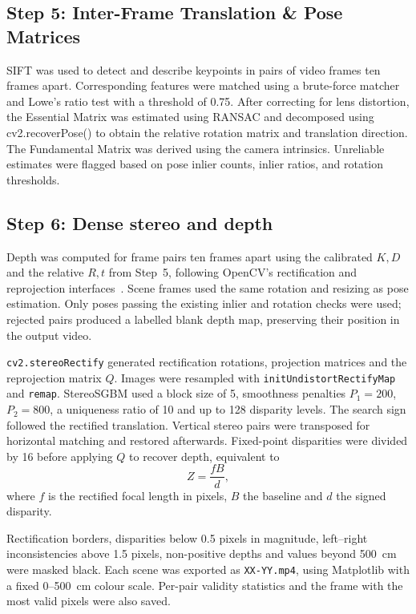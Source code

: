 \documentclass[conference]{IEEEtran}
\begin{document}
\subsection{Step 5: Inter-Frame Translation \& Pose Matrices}
SIFT was used to detect and describe keypoints in pairs of video frames ten frames apart. Corresponding features were matched using a brute-force matcher and Lowe's ratio test with a threshold of 0.75. After correcting for lens distortion, the Essential Matrix was estimated using RANSAC and decomposed using cv2.recoverPose() to obtain the relative rotation matrix and translation direction. The Fundamental Matrix was derived using the camera intrinsics. Unreliable estimates were flagged based on pose inlier counts, inlier ratios, and rotation thresholds.

\subsection{Step 6: Dense stereo and depth}
Depth was computed for frame pairs ten frames apart using the calibrated $K,D$ and the relative $R,t$ from Step~5, following OpenCV's rectification and reprojection interfaces~\cite{opencvCalibration}. Scene frames used the same rotation and resizing as pose estimation. Only poses passing the existing inlier and rotation checks were used; rejected pairs produced a labelled blank depth map, preserving their position in the output video.

\texttt{cv2.stereoRectify} generated rectification rotations, projection matrices and the reprojection matrix $Q$. Images were resampled with \texttt{initUndistortRectifyMap} and \texttt{remap}. StereoSGBM used a block size of 5, smoothness penalties $P_1=200$, $P_2=800$, a uniqueness ratio of 10 and up to 128 disparity levels. The search sign followed the rectified translation. Vertical stereo pairs were transposed for horizontal matching and restored afterwards. Fixed-point disparities were divided by 16 before applying $Q$ to recover depth, equivalent to
\begin{equation}
Z=\frac{fB}{d},
\end{equation}
where $f$ is the rectified focal length in pixels, $B$ the baseline and $d$ the signed disparity.

Rectification borders, disparities below 0.5 pixels in magnitude, left--right inconsistencies above 1.5 pixels, non-positive depths and values beyond 500~cm were masked black. Each scene was exported as \texttt{XX-YY.mp4}, using Matplotlib with a fixed 0--500~cm colour scale. Per-pair validity statistics and the frame with the most valid pixels were also saved.
\end{document}
